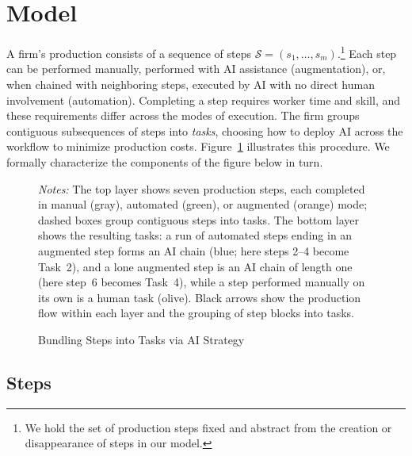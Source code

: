 \section{Model}

A firm's production consists of a sequence of steps $\mathcal{S}=(s_1,\ldots,s_m)$.\footnote{
We hold the set of production steps fixed and abstract from the creation or disappearance of steps in our model.
}
Each step can be performed manually, performed with AI assistance (augmentation), or, when chained with neighboring steps, executed by AI with no direct human involvement (automation).
Completing a step requires worker time and skill, and these requirements differ across the modes of execution.
The firm groups contiguous subsequences of steps into \emph{tasks}, choosing how to deploy AI across the workflow to minimize production costs.
Figure~\ref{fig:steps_tasks} illustrates this procedure.
We formally characterize the components of the figure below in turn. %

\begin{figure}[ht!]
  \begin{center}
  \caption{Bundling Steps into Tasks via AI Strategy}
  \label{fig:steps_tasks}
  \vspace{0.2cm}
  
  \end{center}
  \vspace{0.1cm}
  \footnotesize{\emph{Notes:} The top layer shows seven production steps, each completed in manual (gray), automated (green), or augmented (orange) mode; dashed boxes group contiguous steps into tasks. The bottom layer shows the resulting tasks: a run of automated steps ending in an augmented step forms an AI chain (blue; here steps 2--4 become Task~2), and a lone augmented step is an AI chain of length one (here step~6 becomes Task~4), while a step performed manually on its own is a human task (olive). Black arrows show the production flow within each layer and the grouping of step blocks into tasks.}
\end{figure}



\subsection{Steps}
\label{sec:model.steps}

